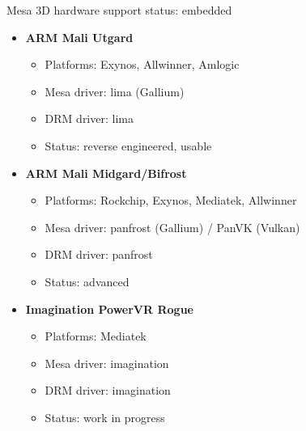 \begin{frame}{Mesa 3D hardware support status: embedded}
  \begin{itemize}
  \item \textbf{ARM Mali Utgard}
    \begin{itemize}
    \item Platforms: Exynos, Allwinner, Amlogic
    \item Mesa driver: lima (Gallium)
    \item DRM driver: lima
    \item Status: reverse engineered, usable
    \end{itemize}
  \item \textbf{ARM Mali Midgard/Bifrost}
    \begin{itemize}
    \item Platforms: Rockchip, Exynos, Mediatek, Allwinner
    \item Mesa driver: panfrost (Gallium) / PanVK (Vulkan)
    \item DRM driver: panfrost
    \item Status: advanced
    \end{itemize}
  \item \textbf{Imagination PowerVR Rogue}
    \begin{itemize}
    \item Platforms: Mediatek
    \item Mesa driver: imagination
    \item DRM driver: imagination
    \item Status: work in progress
    \end{itemize}
  \end{itemize}
\end{frame}

